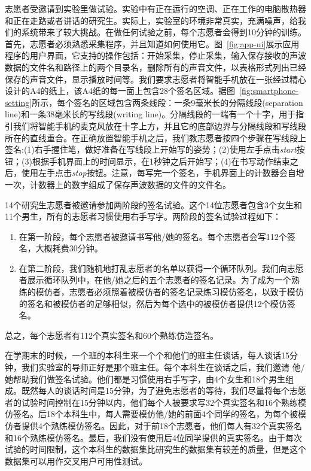 志愿者受邀请到实验里做试验。实验中有正在运行的空调、正在工作的电脑散热器和正在走路或者讲话的研究生。实际上，实验室的环境非常真实，充满噪声，给我们的系统带来了较大挑战。在做任何试验之前，每个志愿者会得到10分钟的训练。首先，志愿者必须熟悉采集程序，并且知道如何使用它。图~\ref{fig:app-ui}展示应用程序的用户界面，它支持的操作包括：开始采集，停止采集，输入保存接收的声波数据的文件名和路径上的两个目录名，删除所有的声音文件，以表格形式列出已经保存的声音文件，显示播放时间等。我们要求志愿者将智能手机放在一张经过精心设计的A4的纸上，该A4纸的每一面上包含28个签名区域。据图~\ref{fig:smartphone-setting}所示，每个签名的区域包含两条线段：一条9毫米长的分隔线段(separation line)和一条38毫米长的写线段(writing line)。分隔线段的一端有一个十字，用于指引我们将智能手机的麦克风放在十字上方，并且它的底部边界与分隔线段和写线段所在的直线重合。在正确放置智能手机之后，我们教志愿者按四个步骤在写线段上签名:(1)右手握住笔，做好准备在写线段上开始写的姿势；(2)使用左手点击\textit{start}按钮；(3)根据手机界面上的时间显示，在1秒钟之后开始写；(4)在书写动作结束之后，使用左手点击\textit{stop}按钮。注意，每写完一个签名，手机界面上的计数器会自增一次，计数器上的数字组成了保存声波数据的文件的文件名。

14个研究生志愿者被邀请参加两阶段的签名试验。这个14位志愿者包含3个女生和11个男生，所有的志愿者习惯使用右手写字。两阶段的签名试验过程如下：
\begin{enumerate}[label=(\arabic*)]
    \item 在第一阶段，每个志愿者被邀请书写他/她的签名。每个志愿者会写112个签名，大概耗费30分钟。
    \item 在第二阶段，我们随机地打乱志愿者的名单以获得一个循环队列。我们向志愿者展示循环队列中，在他/她之后的五个志愿者的签名记录。为了成为一个熟练的模仿者，志愿者必须照着被模仿者的签名记录练习模仿签名，以致于模仿的签名和被模仿者的足够相似，然后为每个选中的被模仿者提供12个模仿签名。
\end{enumerate}
总之，每个志愿者有112个真实签名和60个熟练仿造签名。

在学期末的时候，一个班的本科生来一个个和他们的班主任谈话，每人谈话15分钟，我们实验室的导师正好是那个班主任。每个本科生在谈话之后，我们邀请
他/她帮助我们做签名试验。他们都是习惯使用右手写字，由4个女生和18个男生组成。既然每人的谈话时间是15分钟，为了避免志愿者的等待，我们尽量将每个志愿者的试验时间控制在15分钟以内，他们每个人被要求写32个真实签名和16个熟练模仿签名。后18个本科生中，每人需要模仿他/她的前面4个同学的签名，为每个被模仿者提供4个熟练模仿签名。因此，对于前18个志愿者，他们每人有32个真实签名和16个熟练模仿签名。最后，我们没有使用后4位同学提供的真实签名。由于每次试验的时间限制，这个本科生的数据集比研究生的数据集有较差的质量，但是这个数据集可以用作交叉用户可用性测试。

